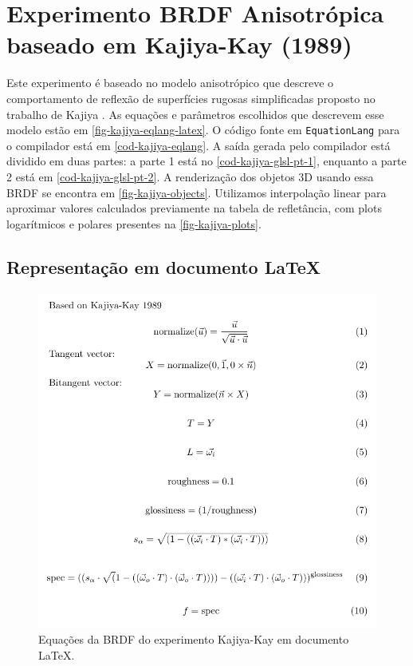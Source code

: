 
\section{Experimento BRDF Anisotrópica baseado em Kajiya-Kay (1989)}

Este experimento é baseado no modelo anisotrópico que descreve o comportamento de reflexão de superfícies rugosas simplificadas proposto no trabalho de Kajiya \cite{kajiya1985anisotropic}. As equações e parâmetros escolhidos que descrevem esse modelo estão em \autoref{fig-kajiya-eqlang-latex}. O código fonte em \texttt{EquationLang} para o compilador está em \autoref{cod-kajiya-eqlang}. A saída gerada pelo compilador está dividido em duas partes: a parte 1 está no \autoref{cod-kajiya-glsl-pt-1}, enquanto a parte 2 está em \autoref{cod-kajiya-glsl-pt-2}. A renderização dos objetos 3D usando essa BRDF se encontra em \autoref{fig-kajiya-objects}. Utilizamos interpolação linear para aproximar valores calculados previamente na tabela de refletância, com plots logarítmicos e polares presentes na \autoref{fig-kajiya-plots}.

\subsection{Representação em documento \LaTeX{}}
\begin{figure}[H]
    \caption{\label{fig-kajiya-eqlang-latex} \small Equações da BRDF do experimento Kajiya-Kay em documento \LaTeX{}.}
    \begin{center}
        \includegraphics[scale=0.92]{./Imagens/brdfs/aniso.pdf}
    \end{center}
\end{figure}

